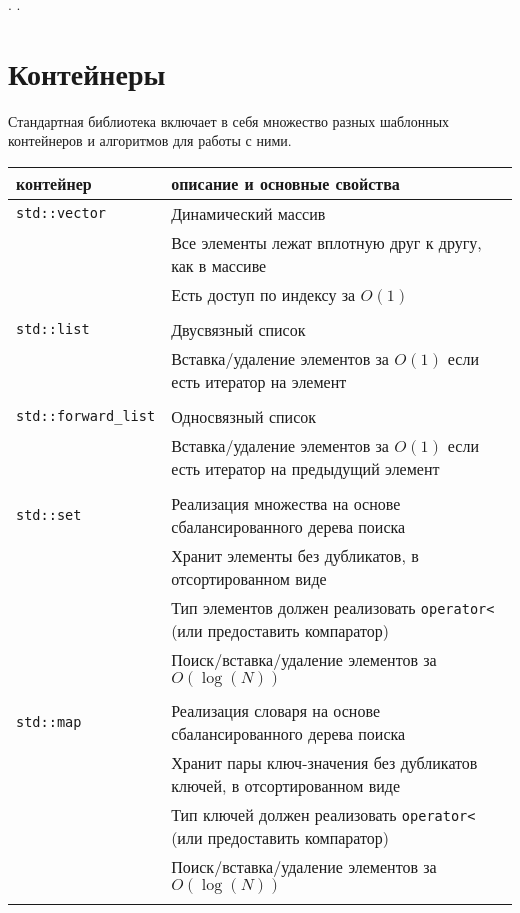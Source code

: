 \documentclass{article}
\begin{document}
\newpage
.
\newpage
.
\newpage



\section*{Контейнеры}
Стандартная библиотека включает в себя множество разных шаблонных контейнеров и алгоритмов для работы с ними.

\begin{center}
\begin{tabular}{ l | l }
 контейнер & описание и основные свойства \\ \hline


 \texttt{std::vector} & Динамический массив \\
                      & Все элементы лежат вплотную друг к другу, как в массиве \\
                      & Есть доступ по индексу за $O(1)$ \\ \\ \hline
 \texttt{std::list} & Двусвязный список \\
                    & Вставка/удаление элементов за $O(1)$ если есть итератор на элемент \\ \\ \hline
 \texttt{std::forward\_list} & Односвязный список \\
                     & Вставка/удаление элементов за $O(1)$ если есть итератор на предыдущий элемент\\ \\ \hline
 \texttt{std::set} & Реализация множества на основе сбалансированного дерева поиска \\
				   & Хранит элементы без дубликатов, в отсортированном виде\\
				   & Тип элементов должен реализовать \texttt{operator<} (или предоставить компаратор)\\
                   & Поиск/вставка/удаление элементов за $O(\log(N))$ \\ \\ \hline
 \texttt{std::map} & Реализация словаря на основе сбалансированного дерева поиска \\
				   & Хранит пары ключ-значения без дубликатов ключей, в отсортированном виде\\
				   & Тип ключей должен реализовать \texttt{operator<}  (или предоставить компаратор)\\
                   & Поиск/вставка/удаление элементов за $O(\log(N))$ \\ \\ \hline

\end{tabular}
\end{center}
\end{document}
